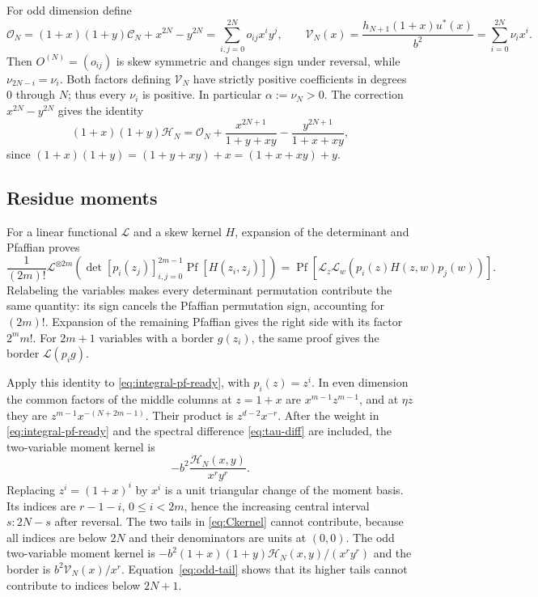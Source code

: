 \documentclass[11pt,a4paper]{amsart}
\theoremstyle{remark}\newtheorem{remark}[theorem]{Remark}
\numberwithin{equation}{section}
\DeclareMathOperator{\Pf}{Pf}
\newcommand{\CC}{\mathscr C}
\newcommand{\OO}{\mathscr O}
\newcommand{\HH}{\mathscr H}
\begin{document}
For odd dimension define
\begin{equation}\label{eq:odd-kernel}
 \OO_N=(1+x)(1+y)\CC_N+x^{2N}-y^{2N}=\sum_{i,j=0}^{2N}o_{ij}x^iy^j,
 \qquad \mathscr V_N(x)=\frac{h_{N+1}(1+x)u^*(x)}{b^2}=\sum_{i=0}^{2N}\nu_ix^i.
\end{equation}
Then $O^{(N)}=(o_{ij})$ is skew symmetric and changes sign under reversal, while $\nu_{2N-i}=\nu_i$. Both factors defining $\mathscr V_N$ have strictly positive coefficients in degrees $0$ through $N$; thus every $\nu_i$ is positive. In particular $\alpha:=\nu_N>0$.
The correction $x^{2N}-y^{2N}$ gives the identity
\begin{equation}\label{eq:odd-tail}
 (1+x)(1+y)\HH_N=\OO_N+\frac{x^{2N+1}}{1+y+xy}-\frac{y^{2N+1}}{1+x+xy},
\end{equation}
since $(1+x)(1+y)=(1+y+xy)+x=(1+x+xy)+y$.

\subsection{Residue moments}
For a linear functional $\mathcal L$ and a skew kernel $H$, expansion of the determinant and Pfaffian proves
\begin{equation}\label{eq:pf-integral}
 \frac1{(2m)!}\mathcal L^{\otimes2m}
 \left(\det[p_i(z_j)]_{i,j=0}^{2m-1}\Pf[H(z_i,z_j)]\right)
 =\Pf[\mathcal L_z\mathcal L_w(p_i(z)H(z,w)p_j(w))].
\end{equation}
Relabeling the variables makes every determinant permutation contribute the same quantity: its sign cancels the Pfaffian permutation sign, accounting for $(2m)!$. Expansion of the remaining Pfaffian gives the right side with its factor $2^mm!$. For $2m+1$ variables with a border $g(z_i)$, the same proof gives the border $\mathcal L(p_i g)$.

Apply this identity to \eqref{eq:integral-pf-ready}, with $p_i(z)=z^i$. In even dimension the common factors of the middle columns at $z=1+x$ are $x^{m-1}z^{m-1}$, and at $\eta z$ they are $z^{m-1}x^{-(N+2m-1)}$. Their product is $z^{d-2}x^{-r}$. After the weight in \eqref{eq:integral-pf-ready} and the spectral difference \eqref{eq:tau-diff} are included, the two-variable moment kernel is
\[
 -b^2\frac{\HH_N(x,y)}{x^ry^r}.
\]
Replacing $z^i=(1+x)^i$ by $x^i$ is a unit triangular change of the moment basis. Its indices are $r-1-i$, $0\le i<2m$, hence the increasing central interval $s:2N-s$ after reversal. The two tails in \eqref{eq:Ckernel} cannot contribute, because all indices are below $2N$ and their denominators are units at $(0,0)$.
The odd two-variable moment kernel is
$-b^2(1+x)(1+y)\HH_N(x,y)/(x^ry^r)$ and the border is $b^2\mathscr V_N(x)/x^r$. Equation~\eqref{eq:odd-tail} shows that its higher tails cannot contribute to indices below $2N+1$.
\end{document}

